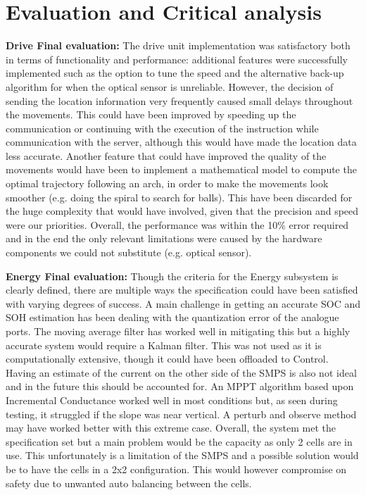 \documentclass[10pt,twoside]{article}
\begin{document}
\section{Evaluation and Critical analysis}
\textbf{Drive Final evaluation:} The drive unit implementation was satisfactory both in terms of functionality and performance: additional features were successfully implemented such as the option to tune the speed and the alternative back-up algorithm for when the optical sensor is unreliable. However, the decision of sending the location information very frequently caused small delays throughout the movements. This could have been improved by speeding up the communication or continuing with the execution of the instruction while communication with the server, although this would have made the location data less accurate. Another feature that could have improved the quality of the movements would have been to implement a mathematical model to compute the optimal trajectory following an arch, in order to make the movements look smoother (e.g. doing the spiral to search for balls). This have been discarded for the huge complexity that would have involved, given that the precision and speed were our priorities. Overall, the performance was within the 10\% error required and in the end the only relevant limitations were caused by the hardware components we could not substitute (e.g. optical sensor).

\textbf{Energy Final evaluation:} Though the criteria for the Energy subsystem is clearly defined, there are multiple ways the specification could have been satisfied with varying degrees of success. A main challenge in getting an accurate SOC and SOH estimation has been dealing with the quantization error of the analogue ports. The moving average filter has worked well in mitigating this but a highly accurate system would require a Kalman filter. This was not used as it is computationally extensive, though it could have been offloaded to Control. Having an estimate of the current on the other side of the SMPS is also not ideal and in the future this should be accounted for. An MPPT algorithm based upon Incremental Conductance worked well in most conditions but, as seen during testing, it struggled if the slope was near vertical. A perturb and observe method may have worked better with this extreme case. Overall, the system met the specification set but a main problem would be the capacity as only 2 cells are in use. This unfortunately is a limitation of the SMPS and a possible solution would be to have the cells in a 2x2 configuration. This would however compromise on safety due to unwanted auto balancing between the cells. 
\end{document}
